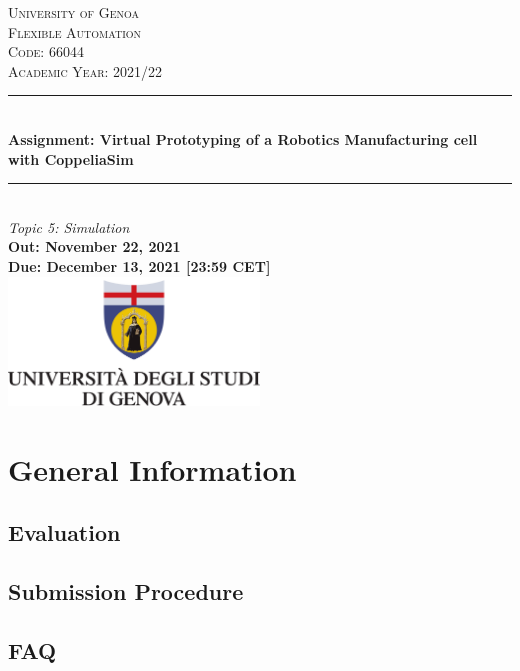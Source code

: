 \documentclass[a4paper]{article}
\begin{document}
\begin{titlepage}

\newcommand{\HRule}{\rule{\linewidth}{0.5mm}} 							%
\center 
 
\textsc{\LARGE University of Genoa}\\[1cm]

\textsc{\Large Flexible Automation}\\[0.2cm]
\textsc{\large Code: 66044}\\[1cm] 										%
\textsc{\large Academic Year: 2021/22}\\[1cm] 										%
\HRule \\[0.8cm]
{ \huge \bfseries Assignment: Virtual Prototyping of a Robotics Manufacturing cell with CoppeliaSim}\\[0.7cm]								%
\HRule \\[1.5cm]
\large
\emph{Topic 5: Simulation }\\[1cm]
{\large \textbf{Out: November 22, 2021 \\[0.5cm] Due: December 13, 2021 [23:59 CET]}}\\[3.5cm]													
\includegraphics[width=0.5\textwidth]{images/UnigeLogo.png}\\[1cm] 	%
\vfill 
\end{titlepage}


\section*{General Information}
\subsection*{Evaluation}

\subsection*{Submission Procedure}

\subsection*{FAQ}
\end{document}
